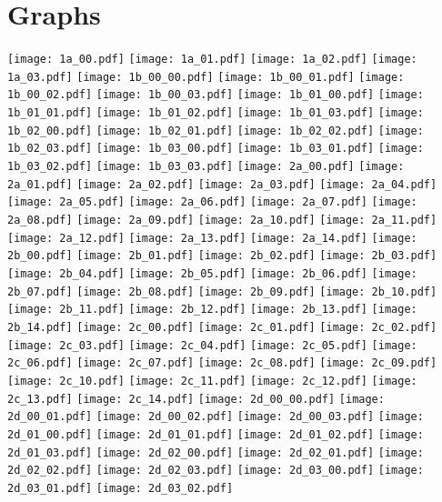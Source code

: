 \chapter{Graphs}
\graphicspath{ {/home/jimi/Dropbox/MasterProject/results/graphs/} }
\centering
\texttt{[image: 1a\_00.pdf]}
\texttt{[image: 1a\_01.pdf]}
\texttt{[image: 1a\_02.pdf]}
\texttt{[image: 1a\_03.pdf]}
\texttt{[image: 1b\_00\_00.pdf]}
\texttt{[image: 1b\_00\_01.pdf]}
\texttt{[image: 1b\_00\_02.pdf]}
\texttt{[image: 1b\_00\_03.pdf]}
\texttt{[image: 1b\_01\_00.pdf]}
\texttt{[image: 1b\_01\_01.pdf]}
\texttt{[image: 1b\_01\_02.pdf]}
\texttt{[image: 1b\_01\_03.pdf]}
\texttt{[image: 1b\_02\_00.pdf]}
\texttt{[image: 1b\_02\_01.pdf]}
\texttt{[image: 1b\_02\_02.pdf]}
\texttt{[image: 1b\_02\_03.pdf]}
\texttt{[image: 1b\_03\_00.pdf]}
\texttt{[image: 1b\_03\_01.pdf]}
\texttt{[image: 1b\_03\_02.pdf]}
\texttt{[image: 1b\_03\_03.pdf]}
\texttt{[image: 2a\_00.pdf]}
\texttt{[image: 2a\_01.pdf]}
\texttt{[image: 2a\_02.pdf]}
\texttt{[image: 2a\_03.pdf]}
\texttt{[image: 2a\_04.pdf]}
\texttt{[image: 2a\_05.pdf]}
\texttt{[image: 2a\_06.pdf]}
\texttt{[image: 2a\_07.pdf]}
\texttt{[image: 2a\_08.pdf]}
\texttt{[image: 2a\_09.pdf]}
\texttt{[image: 2a\_10.pdf]}
\texttt{[image: 2a\_11.pdf]}
\texttt{[image: 2a\_12.pdf]}
\texttt{[image: 2a\_13.pdf]}
\texttt{[image: 2a\_14.pdf]}
\texttt{[image: 2b\_00.pdf]}
\texttt{[image: 2b\_01.pdf]}
\texttt{[image: 2b\_02.pdf]}
\texttt{[image: 2b\_03.pdf]}
\texttt{[image: 2b\_04.pdf]}
\texttt{[image: 2b\_05.pdf]}
\texttt{[image: 2b\_06.pdf]}
\texttt{[image: 2b\_07.pdf]}
\texttt{[image: 2b\_08.pdf]}
\texttt{[image: 2b\_09.pdf]}
\texttt{[image: 2b\_10.pdf]}
\texttt{[image: 2b\_11.pdf]}
\texttt{[image: 2b\_12.pdf]}
\texttt{[image: 2b\_13.pdf]}
\texttt{[image: 2b\_14.pdf]}
\texttt{[image: 2c\_00.pdf]}
\texttt{[image: 2c\_01.pdf]}
\texttt{[image: 2c\_02.pdf]}
\texttt{[image: 2c\_03.pdf]}
\texttt{[image: 2c\_04.pdf]}
\texttt{[image: 2c\_05.pdf]}
\texttt{[image: 2c\_06.pdf]}
\texttt{[image: 2c\_07.pdf]}
\texttt{[image: 2c\_08.pdf]}
\texttt{[image: 2c\_09.pdf]}
\texttt{[image: 2c\_10.pdf]}
\texttt{[image: 2c\_11.pdf]}
\texttt{[image: 2c\_12.pdf]}
\texttt{[image: 2c\_13.pdf]}
\texttt{[image: 2c\_14.pdf]}
\texttt{[image: 2d\_00\_00.pdf]}
\texttt{[image: 2d\_00\_01.pdf]}
\texttt{[image: 2d\_00\_02.pdf]}
\texttt{[image: 2d\_00\_03.pdf]}
\texttt{[image: 2d\_01\_00.pdf]}
\texttt{[image: 2d\_01\_01.pdf]}
\texttt{[image: 2d\_01\_02.pdf]}
\texttt{[image: 2d\_01\_03.pdf]}
\texttt{[image: 2d\_02\_00.pdf]}
\texttt{[image: 2d\_02\_01.pdf]}
\texttt{[image: 2d\_02\_02.pdf]}
\texttt{[image: 2d\_02\_03.pdf]}
\texttt{[image: 2d\_03\_00.pdf]}
\texttt{[image: 2d\_03\_01.pdf]}
\texttt{[image: 2d\_03\_02.pdf]}
